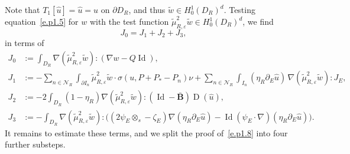 \documentclass[10pt]{amsart}
\let\mathcal\mathscr
\theoremstyle{plain}
\theoremstyle{definition}
\newcommand{\e}{\varepsilon}
\newcommand{\Nc}{\mathcal N}
\newcommand{\Id}{\operatorname{Id}}
\newcommand{\D}{\operatorname{D}}
\newcommand{\Bb}{\bar{\boldsymbol B}}
\begin{document}
Note that $T_1[\hat u]=\hat u=u$ on $\partial D_R$, and thus $\tilde w\in H^1_0(D_R)^d$.
Testing equation~\eqref{e.p1.5} for $w$ with the test function $\tilde\mu_{R,\e}^2\tilde w\in H^1_0(D_R)^d$, we find
\begin{equation}\label{eq:J0123}
J_0=J_1+J_2+J_3,
\end{equation}
in terms of
\begin{align*}
J_0 &:= \int_{D_R}\nabla(\tilde\mu_{R,\e}^2\tilde w):(\nabla w- Q\Id),\\
J_1&:= -\sum_{n\in\Nc_R}\int_{\partial I_n}\tilde\mu_{R,\e}^2\tilde w\cdot\sigma(u,P+P_*-P_n)\nu+\sum_{n\in\Nc_R}\int_{I_n}(\eta_R\partial_E\hat u)\,\nabla(\tilde\mu_{R,\e}^2\tilde w):J_E,\\
J_2&:= -2\int_{D_R}(1-\eta_R)\nabla(\tilde\mu_{R,\e}^2\tilde w):(\Id-\Bb)\D(\hat u),\\
J_3&:= -\int_{D_R}\nabla(\tilde\mu_{R,\e}^2\tilde w):\Big((2\psi_E\otimes_s-\zeta_E)\nabla(\eta_R\partial_E\hat u)-\Id(\psi_E\cdot\nabla)(\eta_R\partial_E\hat u)\Big).
\end{align*}
It remains to estimate these terms, and we split the proof of~\eqref{e.p1.8} into four further substeps.
\end{document}
